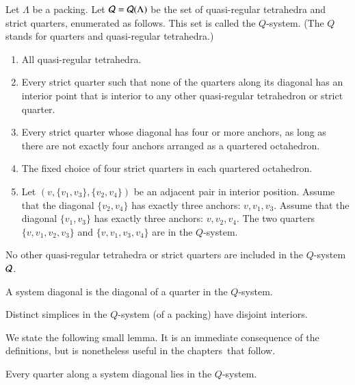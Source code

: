 \begin{definition}[$Q$-system]\label{def:q-system}  Let
$\Lambda$ be a packing. Let ${\mathcal Q}={\mathcal Q}(\Lambda)$ be the set of
quasi-regular tetrahedra and strict quarters, enumerated as
follows. This set is called the $Q$-system.  (The $Q$ stands for
quarters and quasi-regular tetrahedra.)
%


\begin{enumerate}
   \item All quasi-regular tetrahedra.
   \item Every strict quarter such that none of the quarters along
   its diagonal has an interior point that is interior to any other
   quasi-regular tetrahedron or strict quarter.
   \item Every strict quarter whose diagonal has four or more
   anchors, as long as there are not exactly four anchors arranged
   as a quartered
   octahedron.
   \item The fixed choice of four strict quarters in each
   quartered octahedron.
   \item Let $(v,\{v_1,v_3\},\{v_2,v_4\})$ be an adjacent pair in interior
   position.  Assume that the diagonal $\{v_2,v_4\}$ has exactly three anchors:
    $v,v_1,v_3$.  Assume that the diagonal $\{v_1,v_3\}$ has exactly three anchors:
    $v,v_2,v_4$.  The two quarters $\{v,v_1,v_2,v_3\}$ and $\{v,v_1,v_3,v_4\}$ are
    in the $Q$-system.
\end{enumerate}
No other quasi-regular tetrahedra or strict quarters are included
in the $Q$-system ${\mathcal Q}$.
\end{definition}

\begin{definition}
A system diagonal is the diagonal of a quarter in the $Q$-system.
\end{definition}


\begin{claim}\label{thm:nonoverlap}
Distinct simplices in the $Q$-system (of a %
packing) have
disjoint interiors.
\end{claim}


We state the following small lemma. It is an immediate consequence
of the definitions, but is nonetheless useful in the chapters\ that
follow.

\begin{lemma} \label{lemma:diags-engulf}
Every quarter along a system diagonal lies in the $Q$-system.
\end{lemma}

